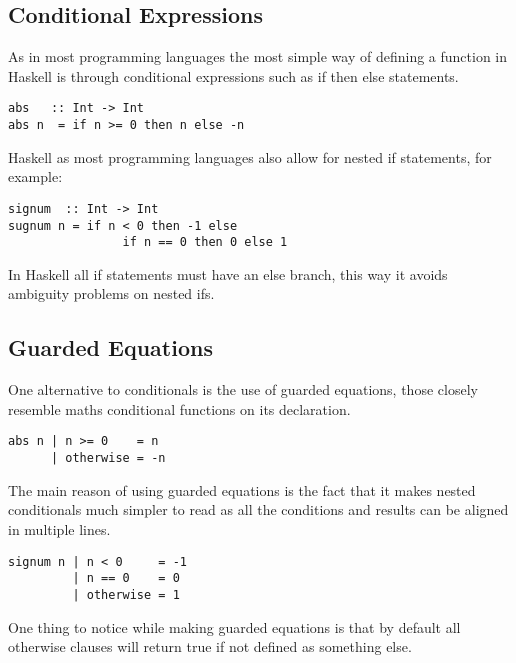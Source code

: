 \documentclass[12pt, oneside]{article}
\begin{document}
\subsection{Conditional Expressions}
As in most programming languages the most simple way of defining a function in Haskell is through conditional expressions such as if then else statements.
\begin{lstlisting}
abs   :: Int -> Int
abs n  = if n >= 0 then n else -n
\end{lstlisting}
Haskell as most programming languages also allow for nested if statements, for example:
\begin{lstlisting}
signum  :: Int -> Int
sugnum n = if n < 0 then -1 else
                if n == 0 then 0 else 1
\end{lstlisting}
In Haskell all if statements must have an else branch, this way it avoids ambiguity problems on nested ifs.
\subsection{Guarded Equations}
One alternative to conditionals is the use of guarded equations, those closely resemble maths conditional functions on its declaration.
\begin{lstlisting}
abs n | n >= 0    = n
      | otherwise = -n
\end{lstlisting}
The main reason of using guarded equations is the fact that it makes nested conditionals much simpler to read as all the conditions and results can be aligned in multiple lines.
\begin{lstlisting}
signum n | n < 0     = -1
         | n == 0    = 0
         | otherwise = 1
\end{lstlisting}
One thing to notice while making guarded equations is that by default all otherwise clauses will return true if not defined as something else.
\end{document}
